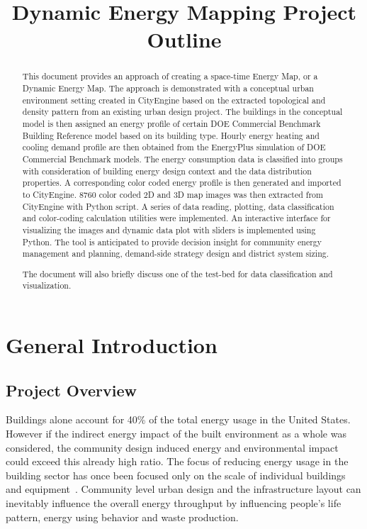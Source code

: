 \documentclass[hidelinks,12pt]{article}
\newcommand{\red}[1]{\textcolor{red!50}{#1}}
\begin{document}
\title{Dynamic Energy Mapping Project Outline}
\maketitle
\tableofcontents
\newpage
\begin{abstract}
  This document provides an approach of creating a space-time Energy
  Map, or a Dynamic Energy Map. The approach is demonstrated with a
  conceptual urban environment setting created in CityEngine based on
  the extracted topological and density pattern from an existing urban
  design project. The buildings in the conceptual model is then
  assigned an energy profile of certain DOE Commercial Benchmark
  Building Reference model based on its building type. Hourly energy
  heating and cooling demand profile are then obtained from the
  EnergyPlus simulation of DOE Commercial Benchmark models. The energy
  consumption data is classified into groups with consideration of
  \red{building energy design context} and the data distribution
  properties. A corresponding color coded energy profile is then
  generated and imported to CityEngine. 8760 color coded 2D and 3D map
  images was then extracted from CityEngine with Python script. A
  series of data reading, plotting, data classification and
  color-coding calculation utilities were implemented. An interactive
  interface for visualizing the images and dynamic data plot with
  sliders is implemented using Python. The tool is anticipated to
  provide decision insight for community energy management and
  planning, demand-side strategy design and district system sizing.
  
  The document will also briefly discuss one of the test-bed for data
  classification and visualization.

\end{abstract}
\newpage

\section{General Introduction}
\subsection{Project Overview}
Buildings alone account for 40\% of the total energy usage in the
United States. However if the indirect energy impact of the built
environment as a whole was considered, the community design induced
energy and environmental impact could exceed this already high
ratio. The focus of reducing energy usage in the building sector has
once been focused only on the scale of individual buildings and
equipment~\cite{Jaccard19971065}. Community level urban design and the
infrastructure layout can inevitably influence the overall energy
throughput by influencing people's life pattern, energy using behavior
and waste production.
\end{document}

